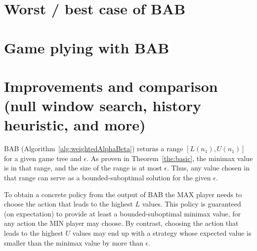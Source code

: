 \documentclass[letterpaper]{article} %
\newcommand{\pess}{\mathit{L}}
\newcommand{\opti}{\mathit{U}}
\newcommand{\rootnode}{\mathit{n_1}}
\begin{document}

\section{Worst / best case of BAB}




\section{Game plying with BAB}




\section{Improvements and comparison (null window search, history heuristic, and more)}




\label{sec:action}
BAB (Algorithm~\ref{alg:weightedAlphaBeta}) returns a range $[\pess(\rootnode), \opti(\rootnode)]$ for a given game tree and $\epsilon$. As proven in Theorem~\ref{the:basic}, the minimax value is in that range, and the size of the range is at most $\epsilon$. Thus, any value chosen in that range can serve as a bounded-suboptimal solution for the given $\epsilon$.

To obtain a concrete policy from the output of BAB the MAX player needs to choose the action that leads to the highest $\pess$ values. This policy is guaranteed (on expectation) to provide at least a bounded-suboptimal minimax value, for any action the MIN player may choose. By contrast, choosing the action that leads to the highest $\opti$ values may end up with a strategy whose expected value is smaller than the minimax value by more than $\epsilon$. %
\end{document}
